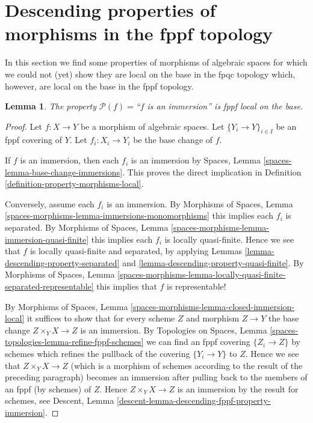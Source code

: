 \documentclass{stacks-project}
\theoremstyle{plain}
\newtheorem{lemma}[subsection]{Lemma}
\theoremstyle{definition}
\theoremstyle{remark}
\numberwithin{equation}{subsection}
\begin{document}
\section{Descending properties of morphisms in the fppf topology}
\label{section-descending-properties-morphisms-fppf}

\noindent
In this section we find some properties of morphisms of algebraic spaces
for which we could not (yet) show they are local on the base in
the fpqc topology which, however, are local on the base
in the fppf topology.

\begin{lemma}
\label{lemma-descending-fppf-property-immersion}
The property $\mathcal{P}(f) =$``$f$ is an immersion''
is fppf local on the base.
\end{lemma}

\begin{proof}
Let $f : X \to Y$ be a morphism of algebraic spaces.
Let $\{Y_i \to Y\}_{i \in I}$ be an fppf covering of $Y$.
Let $f_i : X_i \to Y_i$ be the base change of $f$.

\medskip\noindent
If $f$ is an immersion, then each $f_i$ is an immersion by
Spaces, Lemma \ref{spaces-lemma-base-change-immersions}.
This proves the direct implication in
Definition \ref{definition-property-morphisms-local}.

\medskip\noindent
Conversely, assume each $f_i$ is an immersion. By
Morphisms of Spaces,
Lemma \ref{spaces-morphisms-lemma-immersions-monomorphisms}
this implies each $f_i$ is separated. By
Morphisms of Spaces,
Lemma \ref{spaces-morphisms-lemma-immersion-quasi-finite}
this implies each $f_i$ is locally quasi-finite.
Hence we see that $f$ is locally quasi-finite and separated, by applying
Lemmas \ref{lemma-descending-property-separated}
and \ref{lemma-descending-property-quasi-finite}.
By
Morphisms of Spaces, Lemma
\ref{spaces-morphisms-lemma-locally-quasi-finite-separated-representable}
this implies that $f$ is representable!

\medskip\noindent
By
Morphisms of Spaces, Lemma \ref{spaces-morphisms-lemma-closed-immersion-local}
it suffices to show that for every scheme $Z$ and morphism $Z \to Y$
the base change $Z \times_Y X \to Z$ is an immersion. By
Topologies on Spaces, Lemma \ref{spaces-topologies-lemma-refine-fppf-schemes}
we can find an fppf covering $\{Z_i \to Z\}$ by schemes which refines
the pullback of the covering $\{Y_i \to Y\}$ to $Z$.
Hence we see that $Z \times_Y X \to Z$ (which is a morphism of schemes
according to the result of the preceding paragraph) becomes an immersion
after pulling back to the members of an fppf (by schemes) of $Z$.
Hence $Z \times_Y X \to Z$ is an immersion by the result for schemes, see
Descent, Lemma \ref{descent-lemma-descending-fppf-property-immersion}.
\end{proof}
\end{document}
